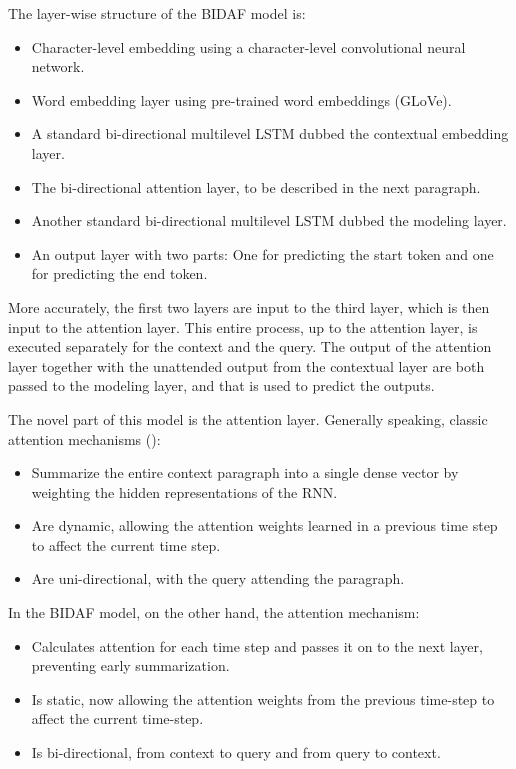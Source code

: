 \documentclass[12pt, a4paper]{article}
\begin{document}
\begin{multicols}{2}
			The layer-wise structure of the BIDAF model is:
			\begin{itemize}
				\item Character-level embedding using a character-level convolutional neural network.
				\item Word embedding layer using pre-trained word embeddings (GLoVe).
				\item A standard bi-directional multilevel LSTM dubbed the contextual embedding layer.
				\item The bi-directional attention layer, to be described in the next paragraph.
				\item Another standard bi-directional multilevel LSTM dubbed the modeling layer.
				\item An output layer with two parts: One for predicting the start token and one for predicting the end token.
			\end{itemize}
		
			More accurately, the first two layers are input to the third layer, which is then input to the attention layer. This entire process, up to the attention layer, is executed separately for the context and the query. The output of the attention layer together with the unattended output from the contextual layer are both passed to the modeling layer, and that is used to predict the outputs.
			
			The novel part of this model is the attention layer. Generally speaking, classic attention mechanisms (\cite{Bahdanau2014}):
			\begin{itemize}
				\item Summarize the entire context paragraph into a single dense vector by weighting the hidden representations of the RNN.
				\item Are dynamic, allowing the attention weights learned in a previous time step to affect the current time step.
				\item Are uni-directional, with the query attending the paragraph.
			\end{itemize}
		
			In the BIDAF model, on the other hand, the attention mechanism:
			\begin{itemize}
				\item Calculates attention for each time step and passes it on to the next layer, preventing early summarization.
				\item Is static, now allowing the attention weights from the previous time-step to affect the current time-step.
				\item Is bi-directional, from context to query and from query to context.
			\end{itemize}
		

\end{multicols}
\end{document}
